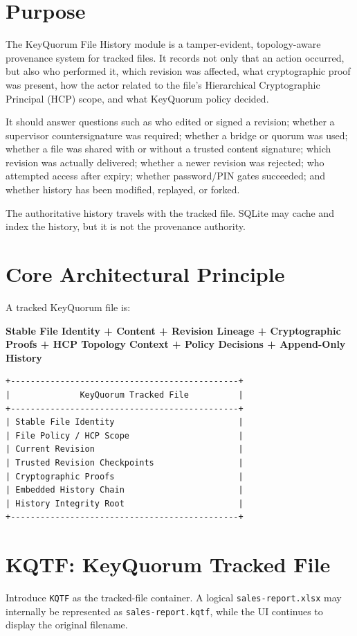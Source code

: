 \documentclass[11pt]{article}
\begin{document}
\section{Purpose}
The KeyQuorum File History module is a tamper-evident, topology-aware provenance system for tracked files. It records not only that an action occurred, but also who performed it, which revision was affected, what cryptographic proof was present, how the actor related to the file's Hierarchical Cryptographic Principal (HCP) scope, and what KeyQuorum policy decided.

It should answer questions such as who edited or signed a revision; whether a supervisor countersignature was required; whether a bridge or quorum was used; whether a file was shared with or without a trusted content signature; which revision was actually delivered; whether a newer revision was rejected; who attempted access after expiry; whether password/PIN gates succeeded; and whether history has been modified, replayed, or forked.

The authoritative history travels with the tracked file. SQLite may cache and index the history, but it is not the provenance authority.

\section{Core Architectural Principle}
A tracked KeyQuorum file is:
\begin{center}
\textbf{Stable File Identity + Content + Revision Lineage + Cryptographic Proofs + HCP Topology Context + Policy Decisions + Append-Only History}
\end{center}

\begin{lstlisting}
+----------------------------------------------+
|              KeyQuorum Tracked File          |
+----------------------------------------------+
| Stable File Identity                         |
| File Policy / HCP Scope                      |
| Current Revision                             |
| Trusted Revision Checkpoints                 |
| Cryptographic Proofs                         |
| Embedded History Chain                       |
| History Integrity Root                       |
+----------------------------------------------+
\end{lstlisting}

\section{KQTF: KeyQuorum Tracked File}
Introduce \texttt{KQTF} as the tracked-file container. A logical \texttt{sales-report.xlsx} may internally be represented as \texttt{sales-report.kqtf}, while the UI continues to display the original filename.
\end{document}
